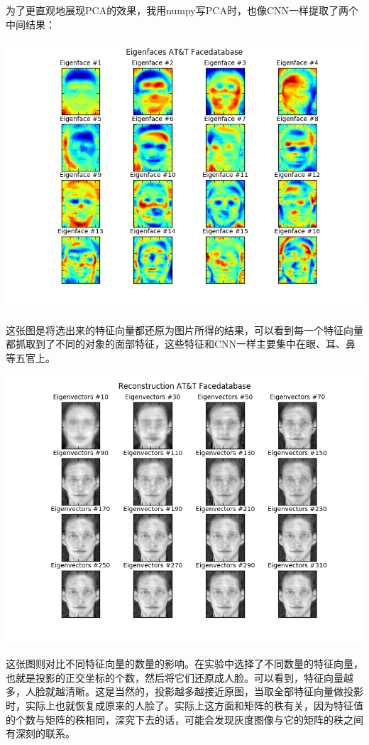\documentclass{article}
\begin{document}
为了更直观地展现PCA的效果，我用numpy写PCA时，也像CNN一样提取了两个中间结果：

\begin{center}
\includegraphics[width=0.8\linewidth]{../image/eigenfaces.png}\\
\end{center}

这张图是将选出来的特征向量都还原为图片所得的结果，可以看到每一个特征向量都抓取到了不同的对象的面部特征，这些特征和CNN一样主要集中在眼、耳、鼻等五官上。

\begin{center}
\includegraphics[width=0.8\linewidth]{../image/eigenvectors.png}\\
\end{center}

这张图则对比不同特征向量的数量的影响。在实验中选择了不同数量的特征向量，也就是投影的正交坐标的个数，然后将它们还原成人脸。可以看到，特征向量越多，人脸就越清晰。这是当然的，投影越多越接近原图，当取全部特征向量做投影时，实际上也就恢复成原来的人脸了。实际上这方面和矩阵的秩有关，因为特征值的个数与矩阵的秩相同，深究下去的话，可能会发现灰度图像与它的矩阵的秩之间有深刻的联系。
\end{document}
